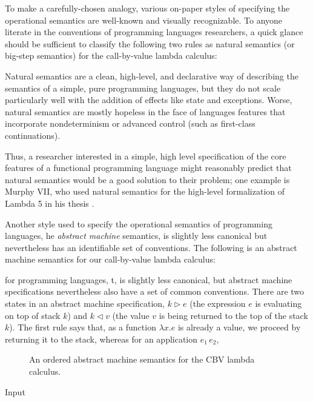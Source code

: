 To make a carefully-chosen analogy, various on-paper styles of
specifying the operational semantics are well-known and visually
recognizable.  To anyone literate in the conventions of programming
languages researchers, a quick glance should be sufficient to classify
the following two rules as natural semantics (or big-step semantics)
for the call-by-value lambda calculus:


Natural semantics are a clean, high-level, and declarative way of
describing the semantics of a simple, pure programming languages, but
they do not scale particularly well with the addition of effects like
state and exceptions. Worse, natural semantics are mostly hopeless in
the face of languages features that incorporate nondeterminism or
advanced control (such as first-class continuations). 

Thus, a researcher interested in a simple, high level specification of
the core features of a functional programming language might
reasonably predict that natural semantics would be a good solution to
their problem; one example is Murphy VII, who used natural semantics
for the high-level formalization of Lambda 5 in his thesis
\cite{murphy08modal}.

Another style used to specify the operational semantics of programming
languages, he {\it abstract
  machine} semantics, is slightly less canonical but nevertheless has
an identifiable set of conventions. The following is an abstract 
machine semantics for our call-by-value lambda calculus:


 for programming languages, t, is slightly less canonical, but abstract machine
specifications nevertheless also have a set of common
conventions. There are two states in an abstract machine
specification, $k \rhd e$ (the expression $e$ is evaluating on top of
stack $k$) and $k \lhd v$ (the value $v$ is being returned to the top
of the stack $k$). The first rule says that, as a function $\lambda x.e$
is already a value, we proceed by returning it to the stack, whereas
for an application $e_1\,e_2$, 

\begin{figure}
\caption{An ordered abstract machine semantics for the CBV lambda calculus.}
\end{figure}

Input


